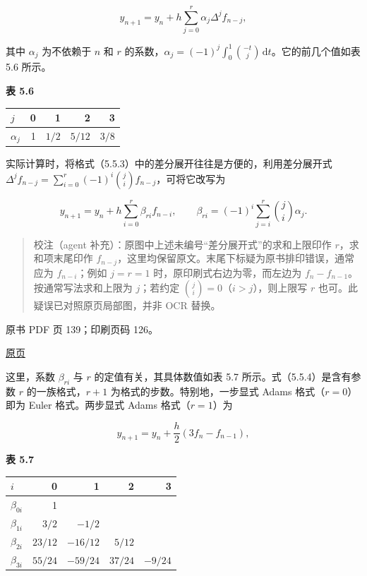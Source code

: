 \[
y_{n+1}=y_n+h\sum_{j=0}^r\alpha_j\Delta^j f_{n-j},
\tag{5.5.3}
\]

其中 \(\alpha_j\) 为不依赖于 \(n\) 和 \(r\) 的系数，\(\alpha_j=(-1)^j\int_0^1\binom{-t}{j}\,\mathrm dt\)。它的前几个值如表 5.6 所示。

\textbf{表 5.6}

{\def\LTcaptype{none} %
\begin{longtable}[]{@{}lrrrr@{}}
\toprule\noalign{}
\(j\) & 0 & 1 & 2 & 3 \\
\midrule\noalign{}
\endhead
\bottomrule\noalign{}
\endlastfoot
\(\alpha_j\) & 1 & \(1/2\) & \(5/12\) & \(3/8\) \\
\end{longtable}
}

实际计算时，将格式（5.5.3）中的差分展开往往是方便的，利用差分展开式 \(\Delta^j f_{n-j}=\sum_{i=0}^r(-1)^i\binom ji f_{n-j}\)，可将它改写为

\[
y_{n+1}=y_n+h\sum_{i=0}^r\beta_{ri}f_{n-i},\qquad
\beta_{ri}=(-1)^i\sum_{j=i}^r\binom ji\alpha_j.
\tag{5.5.4}
\]

\begin{quote}
校注（agent 补充）：原图中上述未编号``差分展开式''的求和上限印作 \(r\)，求和项末尾印作 \(f_{n-j}\)，这里均保留原文。末尾下标疑为原书排印错误，通常应为 \(f_{n-i}\)；例如 \(j=r=1\) 时，原印刷式右边为零，而左边为 \(f_n-f_{n-1}\)。按通常写法求和上限为 \(j\)；若约定 \(\binom ji=0\)（\(i>j\)），则上限写 \(r\) 也可。此疑误已对照原页局部图，并非 OCR 替换。
\end{quote}

\clearpage

原书 PDF 页 139；印刷页码 126。

\href{source-images/pdf-139.jpeg}{原页}

这里，系数 \(\beta_{ri}\) 与 \(r\) 的定值有关，其具体数值如表 5.7 所示。式（5.5.4）是含有参数 \(r\) 的一族格式，\(r+1\) 为格式的步数。特别地，一步显式 Adams 格式（\(r=0\)）即为 Euler 格式。两步显式 Adams 格式（\(r=1\)）为

\[
y_{n+1}=y_n+\frac h2(3f_n-f_{n-1}),
\tag{5.5.5}
\]

\textbf{表 5.7}

{\def\LTcaptype{none} %
\begin{longtable}[]{@{}lrrrr@{}}
\toprule\noalign{}
\(i\) & 0 & 1 & 2 & 3 \\
\midrule\noalign{}
\endhead
\bottomrule\noalign{}
\endlastfoot
\(\beta_{0i}\) & 1 & & & \\
\(\beta_{1i}\) & \(3/2\) & \(-1/2\) & & \\
\(\beta_{2i}\) & \(23/12\) & \(-16/12\) & \(5/12\) & \\
\(\beta_{3i}\) & \(55/24\) & \(-59/24\) & \(37/24\) & \(-9/24\) \\
\end{longtable}
}

